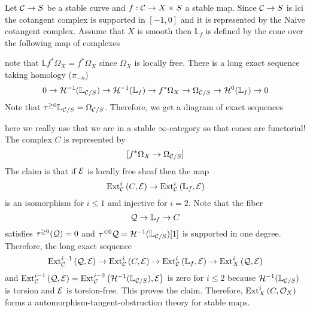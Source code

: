 \documentclass[12pt]{article}
\newcommand{\LL}{\mathbb{L}}
\begin{document}
\begin{example}
Let $\mathcal{C} \to S$ be a stable curve and $f : \mathcal{C} \to X \times S$ a stable map. Since $\mathcal{C} \to S$ is lci the cotangent complex is supported in $[-1,0]$ and it is represented by the Naive cotangent complex. Assume that $X$ is smooth then $\LL_f$ is defined by the cone over the following map of complexes
\begin{center}
\end{center}
note that $\LL f^* \Omega_X = f^* \Omega_X$ since $\Omega_X$ is locally free. There is a long exact sequence taking homology ($\pi_{-n}$)
\[ 0 \to \cH^{-1}(\LL_{\C/S}) \to \cH^{-1}(\LL_f) \to f^* \Omega_X \to \Omega_{\C/S} \to \cH^0(\LL_f) \to 0 \]
Note that $\tau^{\ge 0} \LL_{\C/S} = \Omega_{\C/S}$. Therefore, we get a diagram of exact sequences
\begin{center}
\end{center}
here we really use that we are in a stable $\infty$-category so that cones are functorial! The complex $C$ is represented by
\[ [f^* \Omega_X \to \Omega_{\mathcal{C}/S}] \]
The claim is that if $\mathcal{E}$ is locally free sheaf then the map
\[ \Ext{i}{\C}{C}{\E} \to \Ext{i}{\C}{\LL_f}{\E} \]
is an isomorphism for $i \le 1$ and injective for $i = 2$. Note that the fiber 
\[ \cQ \to \LL_f \to C \]
satisfies $\tau^{\ge 0}(\mathcal{Q}) = 0$ and $\tau^{< 0} \cQ = \cH^{-1}(\LL_{\C/S})[1]$ is supported in one degree. Therefore, the long exact sequence
\[ \Ext{i-1}{\C}{\cQ}{\E} \to \Ext{i}{\C}{C}{\E} \to \Ext{i}{\C}{\LL_f}{\E} \to \Ext{i}{X}{\cQ}{\E} \]
and $\Ext{i-1}{\C}{\cQ}{\E} = \Ext{i-2}{\C}{\cH^{-1}(\LL_{\C/S})}{\E}$ is zero for $i \le 2$ because $\cH^{-1}(\LL_{\C/S})$ is torsion and $\mathcal{E}$ is torsion-free. This proves the claim. Therefore, $\mathrm{Ext}^{i}_{X} \left( C, \mathcal{O}_{X} \right)$ forms a automorphism-tangent-obstruction theory for stable maps.
\end{example}
\end{document}
